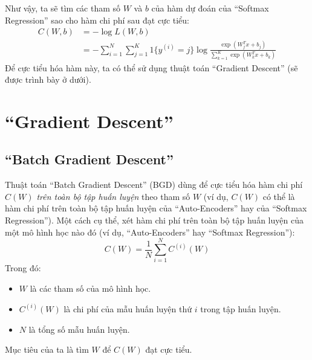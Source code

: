 Như vậy, ta sẽ tìm các tham số $W$ và $b$ của hàm dự đoán của ``Softmax Regression'' sao cho hàm chi phí sau đạt cực tiểu:
\begin{equation}
\begin{split}
	C(W, b) &= -\log L(W, b)\\
			&= -\sum_{i=1}^{N}\sum_{j=1}^{K} 1\{y^{(i)}=j\} \log \frac{\exp(W_j^Tx + b_j)}{\sum_{k=1}^{K}\exp(W_k^Tx + b_k)}
\end{split}
\end{equation}
Để cực tiểu hóa hàm này, ta có thể sử dụng thuật toán ``Gradient Descent'' (sẽ được trình bày ở dưới).
\section{``Gradient Descent''}
\subsection{``Batch Gradient Descent''}
Thuật toán ``Batch Gradient Descent'' (BGD) dùng để cực tiểu hóa hàm chi phí $C(W)$ \emph{trên toàn bộ tập huấn luyện} theo tham số $W$ (ví dụ, $C(W)$ có thể là hàm chi phí trên toàn bộ tập huấn luyện của ``Auto-Encoders'' hay của ``Softmax Regression''). Một cách cụ thể, xét hàm chi phí trên toàn bộ tập huấn luyện của một mô hình học nào đó (ví dụ, ``Auto-Encoders'' hay ``Softmax Regression''):
\begin{equation}
	C(W) = \frac{1}{N} \sum_{i=1}^N C^{(i)}(W)
	\label{eq_CostFunct}
\end{equation}
Trong đó:
\begin{itemize}
	\item $W$ là các tham số của mô hình học.
	\item $C^{(i)}(W)$ là chi phí của mẫu huấn luyện thứ $i$ trong tập huấn luyện.
	\item $N$ là tổng số mẫu huấn luyện.
\end{itemize}
Mục tiêu của ta là tìm $W$ để $C(W)$ đạt cực tiểu.

